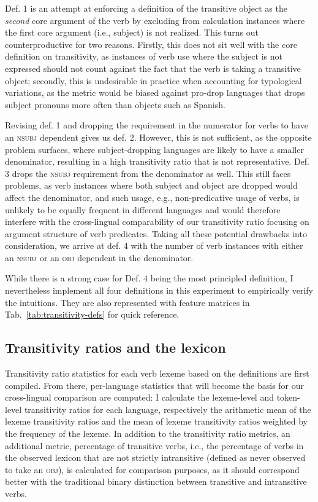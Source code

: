 Def. 1 is an attempt at enforcing a definition of the transitive object as the \textit{second} core argument of the verb by excluding from calculation instances where the first core argument (i.e., subject) is not realized. This turns out counterproductive for two reasons. Firstly, this does not sit well with the core definition on transitivity, as instances of verb use where the subject is not expressed should not count against the fact that the verb is taking a transitive object; secondly, this is undesirable in practice when accounting for typological variations, as the metric would be biased against pro-drop languages that drops subject pronouns more often than objects such as Spanish.

Revising def. 1 and dropping the requirement in the numerator for verbs to have an \textsc{nsubj} dependent gives us def. 2. However, this is not sufficient, as the opposite problem surfaces, where subject-dropping languages are likely to have a smaller denominator, resulting in a high transitivity ratio that is not representative. Def. 3 drops the \textsc{nsubj} requirement from the denominator as well. This still faces problems, as verb instances where both subject and object are dropped would affect the denominator, and such usage, e.g., non-predicative usage of verbs, is unlikely to be equally frequent in different languages and would therefore interfere with the cross-lingual comparability of our transitivity ratio focusing on argument structure of verb predicates. Taking all these potential drawbacks into consideration, we arrive at def. 4 with the number of verb instances with either an \textsc{nsubj} or an \textsc{obj} dependent in the denominator. 



While there is a strong case for Def. 4 being the most principled definition, I nevertheless implement all four definitions in this experiment to empirically verify the intuitions. They are also represented with feature matrices in Tab.~\ref{tab:transitivity-defs} for quick reference.

\subsection{Transitivity ratios and the lexicon}\label{subsec:transitivity-lexicon}

Transitivity ratio statistics for each verb lexeme based on the definitions are first compiled. From there, per-language statistics that will become the basis for our cross-lingual comparison are computed: I calculate the lexeme-level and token-level transitivity ratios for each language, respectively the arithmetic mean of the lexeme transitivity ratios and the mean of lexeme transitivity ratios weighted by the frequency of the lexeme. In addition to the transitivity ratio metrics, an additional metric, percentage of transitive verbs, i.e., the percentage of verbs in the observed lexicon that are not strictly intransitive (defined as never observed to take an \textsc{obj}), is calculated for comparison purposes, as it should correspond better with the traditional binary distinction between transitive and intransitive verbs.

